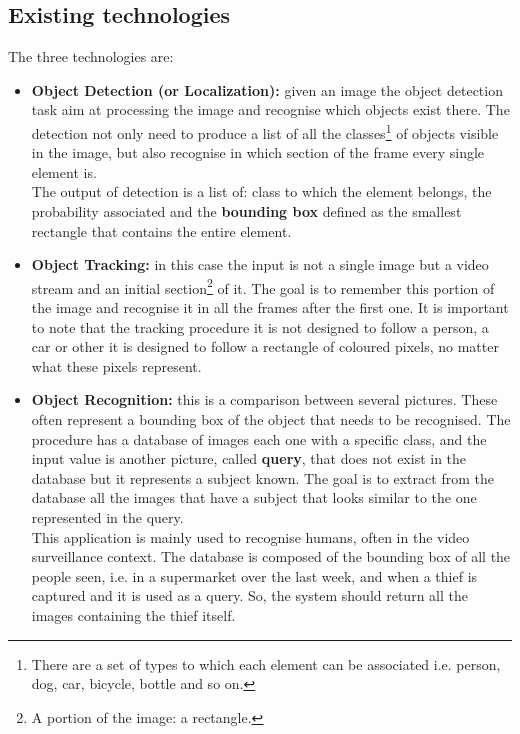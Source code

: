 \subsection{Existing technologies}\label{sec:existingTechnologies}
The three technologies are:
\begin{itemize}
	\item \textbf{Object Detection (or Localization):} given an image the object detection task aim at processing the image and recognise which objects exist there. The detection not only need to produce a list of all the classes\footnote{There are a set of types to which each element can be associated i.e. person, dog, car, bicycle, bottle and so on.} of objects visible in the image, but also recognise in which section of the frame every single element is.\\
	The output of detection is a list of: class to which the element belongs, the probability associated and the \textbf{bounding box} defined as the smallest rectangle that contains the entire element.

	\item \textbf{Object Tracking:} in this case the input is not a single image but a video stream and an initial section\footnote{A portion of the image: a rectangle.} of it. The goal is to remember this portion of the image and recognise it in all the frames after the first one. It is important to note that the tracking procedure it is not designed to follow a person, a car or other it is designed to follow a rectangle of coloured pixels, no matter what these pixels represent.

	\item \textbf{Object Recognition:} this is a comparison between several pictures. These often represent a bounding box of the object that needs to be recognised. The procedure has a database of images each one with a specific class, and the input value is another picture, called \textbf{query}, that does not exist in the database but it represents a subject known. The goal is to extract from the database all the images that have a subject that looks similar to the one represented in the query.\\
	This application is mainly used to recognise humans, often in the video surveillance context. The database is composed of the bounding box of all the people seen, i.e. in a supermarket over the last week, and when a thief is captured and it is used as a query. So, the system should return all the images containing the thief itself.
\end{itemize}

